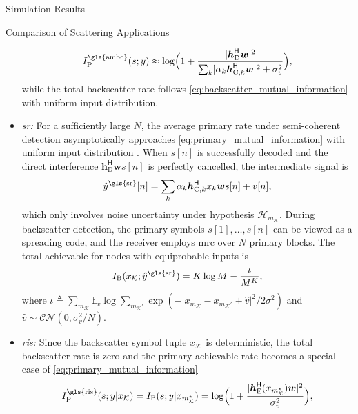 \documentclass[journal,12pt,onecolumn,draftclsnofoot]{IEEEtran}
\theoremstyle{remark}
\begin{document}
\begin{section}{Simulation Results}
\begin{subsection}{Comparison of Scattering Applications}
\begin{itemize}
			\begin{equation}
				I_{\text{P}}^{\text{\gls{ambc}}}(s;y) \approx \log \Bigl(1 + \frac{\lvert\boldsymbol{h}_{\text{D}}^\mathsf{H}\boldsymbol{w}\rvert^2}{\sum_{k}\lvert \alpha_k \boldsymbol{h}_{\text{C},k}^\mathsf{H} \boldsymbol{w}\rvert^2+\sigma_v^2}\Bigr),
			\end{equation}
			while the total backscatter rate follows \eqref{eq:backscatter_mutual_information} with uniform input distribution.
			\item \emph{\gls{sr}:} For a sufficiently large $N$, the average primary rate under semi-coherent detection asymptotically approaches \eqref{eq:primary_mutual_information} with uniform input distribution \cite{Long2020a}.
			When $s[n]$ is successfully decoded and the direct interference $\boldsymbol{h}_{\text{D}}^\mathsf{H} \boldsymbol{w} s[n]$ is perfectly cancelled, the intermediate signal is
			\begin{equation}
				\hat{y}^{\text{\gls{sr}}}[n] = \sum_{k} \alpha_k \boldsymbol{h}_{\text{C},k}^\mathsf{H} x_k \boldsymbol{w} s[n] + v[n],
				\label{eq:intermediate_signal}
			\end{equation}
			which only involves noise uncertainty under hypothesis $\mathcal{H}_{m_{\mathcal{K}}}$.
			During backscatter detection, the primary symbols $s[1],\ldots,s[n]$ can be viewed as a spreading code, and the receiver employs \gls{mrc} over $N$ primary blocks.
			The total achievable for nodes with equiprobable inputs is \cite{Wang2014a}
			\begin{equation}
				I_{\text{B}}(x_{\mathcal{K}};\hat{y}^{\text{\gls{sr}}}) = K \log M - \frac{\iota}{M^K},
			\end{equation}
			where $\iota \triangleq \sum_{m_{\mathcal{K}}} \mathbb{E}_{\hat{v}} \log \sum_{m_{\mathcal{K}}'} \exp ( - {\lvert x_{m_{\mathcal{K}}} - x_{m_{\mathcal{K}}'} + \hat{v} \rvert^2}/{2 \sigma^2} )$ and $\hat{v} \sim \mathcal{CN}(0,\sigma_v^2/N)$.
			\item \emph{\gls{ris}:} Since the backscatter symbol tuple $x_{\mathcal{K}}$ is deterministic, the total backscatter rate is zero and the primary achievable rate becomes a special case of \eqref{eq:primary_mutual_information}
			\begin{equation}
				I_{\text{P}}^{\text{\gls{ris}}}(s;y|x_{\mathcal{K}}) = I_{\text{P}}(s;y|x_{m_{\mathcal{K}}^{\star}}) = \log \Bigl(1 + \frac{\lvert \boldsymbol{h}_{\text{E}}^\mathsf{H}(x_{m_{\mathcal{K}}^{\star}}) \boldsymbol{w} \rvert^2}{\sigma_v^2}\Bigr),

\end{equation}
\end{itemize}
\end{subsection}
\end{section}
\end{document}
